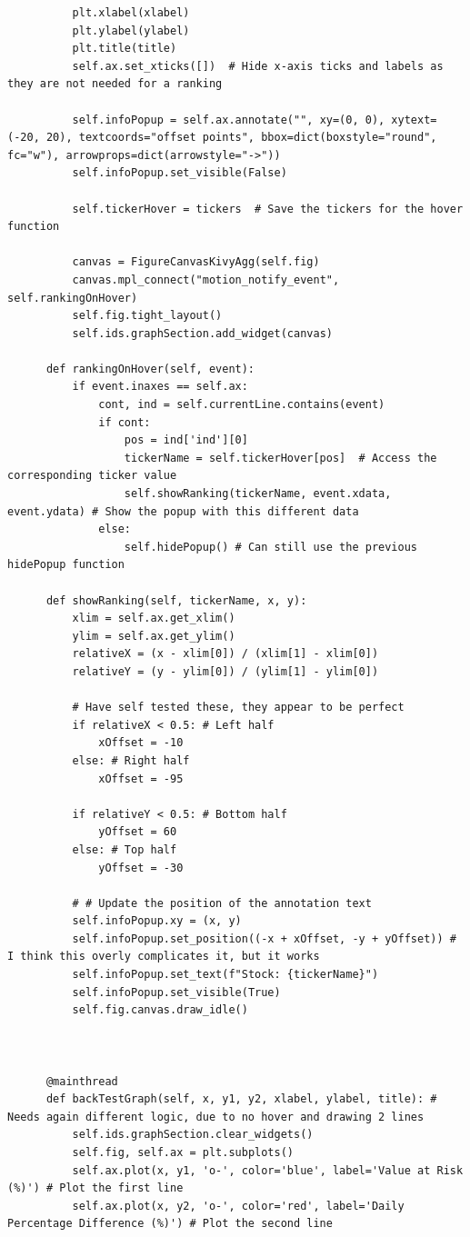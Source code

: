 \documentclass{article}
\begin{document}
\begin{verbatim}
          plt.xlabel(xlabel)
          plt.ylabel(ylabel)
          plt.title(title)
          self.ax.set_xticks([])  # Hide x-axis ticks and labels as they are not needed for a ranking
      
          self.infoPopup = self.ax.annotate("", xy=(0, 0), xytext=(-20, 20), textcoords="offset points", bbox=dict(boxstyle="round", fc="w"), arrowprops=dict(arrowstyle="->"))
          self.infoPopup.set_visible(False)
      
          self.tickerHover = tickers  # Save the tickers for the hover function
      
          canvas = FigureCanvasKivyAgg(self.fig)
          canvas.mpl_connect("motion_notify_event", self.rankingOnHover)
          self.fig.tight_layout()
          self.ids.graphSection.add_widget(canvas)

      def rankingOnHover(self, event):
          if event.inaxes == self.ax:
              cont, ind = self.currentLine.contains(event)
              if cont:
                  pos = ind['ind'][0]
                  tickerName = self.tickerHover[pos]  # Access the corresponding ticker value
                  self.showRanking(tickerName, event.xdata, event.ydata) # Show the popup with this different data
              else:
                  self.hidePopup() # Can still use the previous hidePopup function

      def showRanking(self, tickerName, x, y): 
          xlim = self.ax.get_xlim()
          ylim = self.ax.get_ylim()
          relativeX = (x - xlim[0]) / (xlim[1] - xlim[0])
          relativeY = (y - ylim[0]) / (ylim[1] - ylim[0])
      
          # Have self tested these, they appear to be perfect
          if relativeX < 0.5: # Left half
              xOffset = -10
          else: # Right half
              xOffset = -95

          if relativeY < 0.5: # Bottom half
              yOffset = 60
          else: # Top half
              yOffset = -30
      
          # # Update the position of the annotation text
          self.infoPopup.xy = (x, y)
          self.infoPopup.set_position((-x + xOffset, -y + yOffset)) # I think this overly complicates it, but it works
          self.infoPopup.set_text(f"Stock: {tickerName}")
          self.infoPopup.set_visible(True)
          self.fig.canvas.draw_idle()



      @mainthread 
      def backTestGraph(self, x, y1, y2, xlabel, ylabel, title): # Needs again different logic, due to no hover and drawing 2 lines
          self.ids.graphSection.clear_widgets()
          self.fig, self.ax = plt.subplots()
          self.ax.plot(x, y1, 'o-', color='blue', label='Value at Risk (%)') # Plot the first line
          self.ax.plot(x, y2, 'o-', color='red', label='Daily Percentage Difference (%)') # Plot the second line


\end{verbatim}
\end{document}
